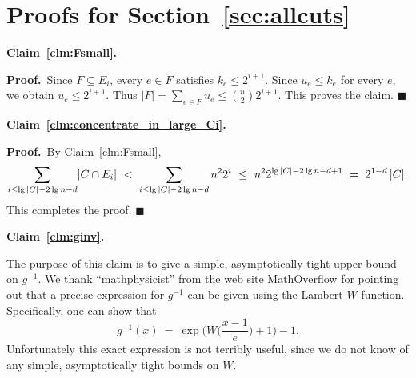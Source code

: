 \documentclass[11pt]{article}
\newcommand{\proofbelow}{8pt}
\numberwithin{equation}{section}
\renewenvironment{proof}{\noindent\textbf{Proof.}\,}{\afterproof}
\newcommand{\afterproof}{\hfill $\blacksquare$ \par \vspace{\proofbelow}}
\newcommand{\repeatclaim}[2]{\vspace{6pt}\noindent\textbf{#1. }{\it #2} \vspace{6pt}}
\newcommand{\smallfrac}[2]{{\textstyle \frac{#1}{#2}}}
\newcommand{\intersect}{\cap}
\newcommand{\abs}[1]{\lvert #1 \rvert}
\newcommand{\card}[1]{\abs{#1}}
\newcommand{\AppendixName}[1]{\label{app:#1}}
\newcommand{\Claim}[1]{Claim~\ref{clm:#1}}
\newcommand{\Section}[1]{Section~\ref{sec:#1}}
\begin{document}
\section{Proofs for \Section{allcuts}}
\AppendixName{calcproof}

\repeatclaim{\Claim{Fsmall}}{\clmfsmall}

\begin{proof}
Since $F \subseteq E_i$, every $e \in F$ satisfies $k_e \leq 2^{i+1}$.
Since $u_e \leq k_e$ for every $e$, we obtain $u_e \leq 2^{i+1}$.
Thus $|F| = \sum_{e \in F} u_e \leq \binom{n}{2} 2^{i+1}$.
This proves the claim.
\end{proof}


\repeatclaim{\Claim{concentrate_in_large_Ci}}{\clmconc}

\begin{proof}
By Claim~\ref{clm:Fsmall},
$$
\sum_{i\le \lg |C|-2\lg n- d} \card{C \intersect E_i}
~<~ \sum_{i\le \lg |C|-2\lg n - d} n^2 2^i \\
~\le~ n^2 2^{\lg |C|-2\lg n -d +1} \\
~=~ 2^{1-d} \, |C|.
$$
This completes the proof.
\end{proof}


\repeatclaim{\Claim{ginv}}{\clmginv}

The purpose of this claim is to give a simple, asymptotically tight upper bound on $g^{-1}$.
We thank ``mathphysicist'' from the web site MathOverflow
for pointing out that a precise expression for $g^{-1}$ can be given using the Lambert $W$ function.
Specifically, one can show that
$$
g^{-1}(x) ~=~ 
\exp\Big( W\big(\smallfrac{x-1}{e}\big)+1\Big)-1.
$$
Unfortunately this exact expression is not terribly useful,
since we do not know of any simple, asymptotically tight bounds on $W$.
\end{document}
